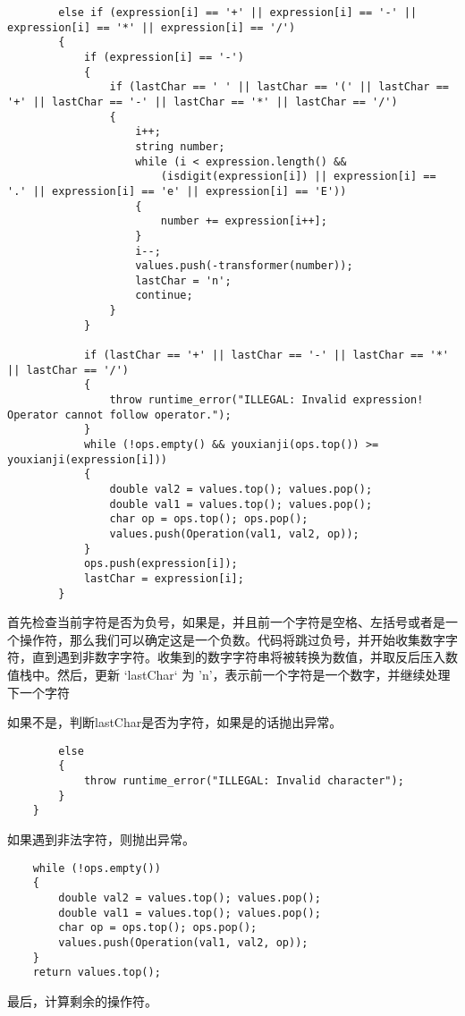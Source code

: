 \documentclass[UTF8]{ctexart}
\begin{document}
\begin{verbatim}
        else if (expression[i] == '+' || expression[i] == '-' || expression[i] == '*' || expression[i] == '/') 
        {   
            if (expression[i] == '-') 
            {
                if (lastChar == ' ' || lastChar == '(' || lastChar == '+' || lastChar == '-' || lastChar == '*' || lastChar == '/') 
                {
                    i++; 
                    string number;
                    while (i < expression.length() &&
                        (isdigit(expression[i]) || expression[i] == '.' || expression[i] == 'e' || expression[i] == 'E')) 
                    {
                        number += expression[i++];
                    }
                    i--; 
                    values.push(-transformer(number)); 
                    lastChar = 'n'; 
                    continue; 
                }
            }

            if (lastChar == '+' || lastChar == '-' || lastChar == '*' || lastChar == '/') 
            {
                throw runtime_error("ILLEGAL: Invalid expression! Operator cannot follow operator.");
            }
            while (!ops.empty() && youxianji(ops.top()) >= youxianji(expression[i])) 
            {
                double val2 = values.top(); values.pop();
                double val1 = values.top(); values.pop();
                char op = ops.top(); ops.pop();
                values.push(Operation(val1, val2, op));
            }
            ops.push(expression[i]);
            lastChar = expression[i];
        }
\end{verbatim}
首先检查当前字符是否为负号，如果是，并且前一个字符是空格、左括号或者是一个操作符，那么我们可以确定这是一个负数。代码将跳过负号，并开始收集数字字符，直到遇到非数字字符。收集到的数字字符串将被转换为数值，并取反后压入数值栈中。然后，更新 `lastChar` 为 'n'，表示前一个字符是一个数字，并继续处理下一个字符

如果不是，判断lastChar是否为字符，如果是的话抛出异常。

\begin{verbatim}
        else 
        {
            throw runtime_error("ILLEGAL: Invalid character");
        }
    }
\end{verbatim}
如果遇到非法字符，则抛出异常。

\begin{verbatim}
    while (!ops.empty()) 
    {
        double val2 = values.top(); values.pop();
        double val1 = values.top(); values.pop();
        char op = ops.top(); ops.pop();
        values.push(Operation(val1, val2, op));
    }
    return values.top();
\end{verbatim}
最后，计算剩余的操作符。
\end{document}
